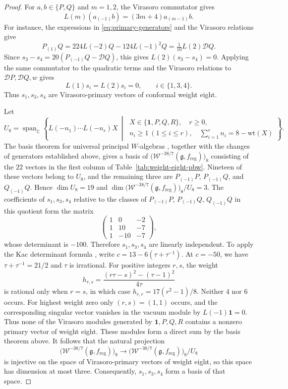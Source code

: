 \documentclass[11pt]{amsart}
\numberwithin{equation}{section}
\theoremstyle{definition}
\theoremstyle{remark}
\newcommand{\g}{\mathfrak g}
\newcommand{\one}{\mathbf1}
\begin{document}
\begin{proof}
For $a,b\in\{P,Q\}$ and $m=1,2$, the Virasoro commutator gives
\[
 L(m)(a_{(-1)}b)=(3m+4)a_{(m-1)}b.
\]
For instance, the expressions in \eqref{eq:primary-generators} and
the Virasoro relations give
\[
 P_{(1)}Q=224L(-2)Q-124L(-1)^2Q=\tfrac1{10}L(2)\mathcal DQ.
\]
Since $s_3-s_4=20(P_{(-1)}Q-\mathcal DQ)$, this gives
$L(2)(s_3-s_4)=0$. Applying the same commutator to the quadratic
terms and the Virasoro relations to $\mathcal DP,\mathcal DQ,w$ gives
\[
 L(1)s_i=L(2)s_i=0,\qquad i\in\{1,3,4\}.
\]
Thus $s_1,s_3,s_4$ are Virasoro-primary vectors of conformal
weight eight.
	
	Let
\[
 U_8=\operatorname{span}_{\mathbb C}
 \left\{L(-n_1)\cdots L(-n_r)X\ \middle|\
 \begin{gathered}
 X\in\{\mathbf1,P,Q,R\},\quad r\geq0,\\
 n_i\geq1\ (1\leq i\leq r),\quad
 \sum_{i=1}^r n_i=8-\mathrm{wt}(X)
 \end{gathered}\right\}.
\]
	The basis theorem for universal principal $W$-algebras
\cite[Proposition~4.12.1(iii)]{Ara07}, together with the changes of generators
established above, gives a basis of $\bigl(\mathcal W^{-38/7}(\g,f_{\mathrm{reg}})\bigr)_8$
consisting of the $22$ vectors in the first column of
Table~\ref{tab:weight-eight-pbw}.
Nineteen of these vectors belong to $U_8$, and the remaining three are
$P_{(-1)}P$, $P_{(-1)}Q$, and $Q_{(-1)}Q$.
Hence $\dim U_8=19$ and $\dim \bigl(\mathcal W^{-38/7}(\g,f_{\mathrm{reg}})\bigr)_8/U_8=3$.
The coefficients of $s_1,s_3,s_4$ relative to the classes of
$P_{(-1)}P$, $P_{(-1)}Q$, $Q_{(-1)}Q$ in this quotient form the matrix
\[
 \begin{pmatrix}
  1&0&-2\\
  1&10&-7\\
  1&-10&-7
 \end{pmatrix},
\]
whose determinant is $-100$. Therefore $s_1,s_3,s_4$ are linearly independent.
To apply the Kac determinant formula \cite{KacDet,FeFu}, write
$c=13-6(\tau+\tau^{-1})$. At $c=-50$, we have
$\tau+\tau^{-1}=21/2$ and $\tau$ is irrational. For positive integers
$r,s$, the weight
\[
 h_{r,s}=\frac{(r\tau-s)^2-(\tau-1)^2}{4\tau}
\]
is rational only when $r=s$, in which case $h_{r,r}=17(r^2-1)/8$.
Neither $4$ nor $6$ occurs. For highest weight zero only $(r,s)=(1,1)$
occurs, and the corresponding singular vector vanishes in the vacuum
module by $L(-1)\one=0$. Thus none of the Virasoro modules
generated by $\one,P,Q,R$ contains a nonzero primary vector of weight
eight. These modules form a direct sum by the basis theorem above.
It follows that the natural projection
\[
 \bigl(\mathcal W^{-38/7}(\g,f_{\mathrm{reg}})\bigr)_8
 \longrightarrow
 \bigl(\mathcal W^{-38/7}(\g,f_{\mathrm{reg}})\bigr)_8/U_8
\]
is injective on the space
	of Virasoro-primary vectors of weight eight,
	so this space has dimension at most three.
	Consequently, $s_1,s_3,s_4$ form a basis of that space.
	

\end{proof}
\end{document}
